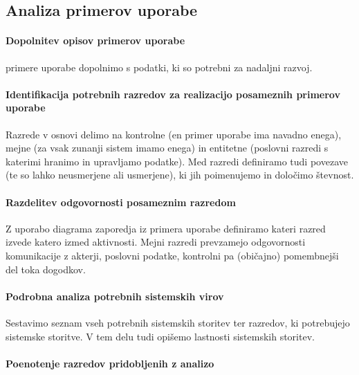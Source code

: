 \documentclass[a4paper,12pt]{report}
\begin{document}
   \subsection{Analiza primerov uporabe}
   \paragraph{Dopolnitev opisov primerov uporabe} primere uporabe dopolnimo s podatki, ki so potrebni za nadaljni razvoj.

   \paragraph{Identifikacija potrebnih razredov za realizacijo posameznih primerov uporabe} 
   Razrede v osnovi delimo na kontrolne (en primer uporabe ima navadno enega), mejne (za vsak zunanji sistem imamo enega)
   in entitetne (poslovni razredi s katerimi hranimo in upravljamo podatke). 
   Med razredi definiramo tudi povezave (te so lahko neusmerjene ali usmerjene), ki jih poimenujemo in določimo števnost.

   \paragraph{Razdelitev odgovornosti posameznim razredom}
   Z uporabo diagrama zaporedja iz primera uporabe definiramo kateri razred izvede katero izmed aktivnosti. 
   Mejni razredi prevzamejo odgovornosti komunikacije z akterji, poslovni podatke, kontrolni pa (običajno) pomembnejši del toka dogodkov.

   \paragraph{Podrobna analiza potrebnih sistemskih virov} Sestavimo seznam vseh potrebnih sistemskih storitev ter razredov, ki potrebujejo sistemske storitve.
   V tem delu tudi opišemo lastnosti sistemskih storitev.

   \paragraph{Poenotenje razredov pridobljenih z analizo}
\end{document}
